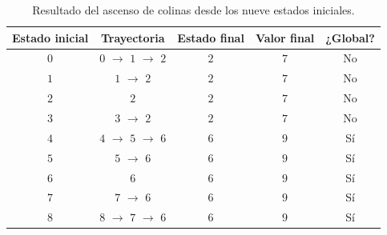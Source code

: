 \begin{table}[H]
\centering
\small
\setlength{\tabcolsep}{6pt}
\renewcommand{\arraystretch}{1.15}
\begin{tabular}{|c|c|c|c|c|}
\hline
\rowcolor{encabezado}\textbf{Estado inicial} & \textbf{Trayectoria} & \textbf{Estado final} & \textbf{Valor final} & \textbf{¿Global?} \\
\hline
$0$ & $0$ $\to$ $1$ $\to$ $2$ & $2$ & $7$ & No \\
\hline
$1$ & $1$ $\to$ $2$ & $2$ & $7$ & No \\
\hline
$2$ & $2$ & $2$ & $7$ & No \\
\hline
$3$ & $3$ $\to$ $2$ & $2$ & $7$ & No \\
\hline
$4$ & $4$ $\to$ $5$ $\to$ $6$ & $6$ & $9$ & Sí \\
\hline
$5$ & $5$ $\to$ $6$ & $6$ & $9$ & Sí \\
\hline
$6$ & $6$ & $6$ & $9$ & Sí \\
\hline
$7$ & $7$ $\to$ $6$ & $6$ & $9$ & Sí \\
\hline
$8$ & $8$ $\to$ $7$ $\to$ $6$ & $6$ & $9$ & Sí \\
\hline
\end{tabular}
\caption{Resultado del ascenso de colinas desde los nueve estados iniciales.}
\label{tab:p2b-trayectorias}
\end{table}
